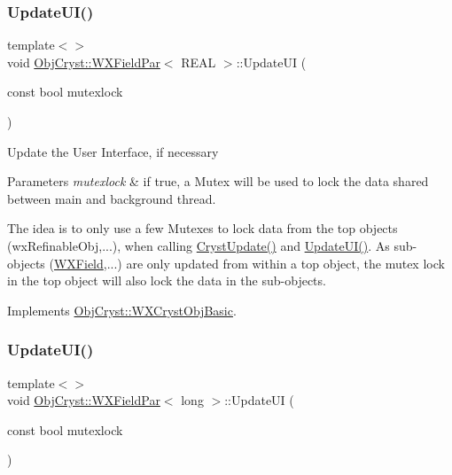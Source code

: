 \subsubsection{\texorpdfstring{UpdateUI()}{UpdateUI()}\hspace{0.1cm}{\footnotesize\ttfamily [2/3]}}
{\footnotesize\ttfamily template$<$$>$ \\
void \mbox{\hyperlink{class_obj_cryst_1_1_w_x_field_par}{Obj\+Cryst\+::\+W\+X\+Field\+Par}}$<$ R\+E\+AL $>$\+::Update\+UI (\begin{DoxyParamCaption}\item[{const bool}]{mutexlock }\end{DoxyParamCaption})\hspace{0.3cm}{\ttfamily [virtual]}}

Update the User Interface, if necessary


\begin{DoxyParams}{Parameters}
{\em mutexlock} & if true, a Mutex will be used to lock the data shared between main and background thread.\\
\hline
\end{DoxyParams}
The idea is to only use a few Mutexes to lock data from the top objects (wx\+Refinable\+Obj,...), when calling \mbox{\hyperlink{class_obj_cryst_1_1_w_x_field_par_a9cee56b1dc7a9695535c7461be7d9e5f}{Cryst\+Update()}} and \mbox{\hyperlink{class_obj_cryst_1_1_w_x_field_par_a1777f9713ca5d40c29c5bd3ab5484aff}{Update\+U\+I()}}. As sub-\/objects (\mbox{\hyperlink{class_obj_cryst_1_1_w_x_field}{W\+X\+Field}},...) are only updated from within a top object, the mutex lock in the top object will also lock the data in the sub-\/objects. 

Implements \mbox{\hyperlink{class_obj_cryst_1_1_w_x_cryst_obj_basic_a3818940b7031ff7e45cf2178c4a99c90}{Obj\+Cryst\+::\+W\+X\+Cryst\+Obj\+Basic}}.

\mbox{\label{class_obj_cryst_1_1_w_x_field_par_a97d7133e0348b189e699e5c0c23bf97c}} 
\subsubsection{\texorpdfstring{UpdateUI()}{UpdateUI()}\hspace{0.1cm}{\footnotesize\ttfamily [3/3]}}
{\footnotesize\ttfamily template$<$$>$ \\
void \mbox{\hyperlink{class_obj_cryst_1_1_w_x_field_par}{Obj\+Cryst\+::\+W\+X\+Field\+Par}}$<$ long $>$\+::Update\+UI (\begin{DoxyParamCaption}\item[{const bool}]{mutexlock }\end{DoxyParamCaption})\hspace{0.3cm}{\ttfamily [virtual]}}

